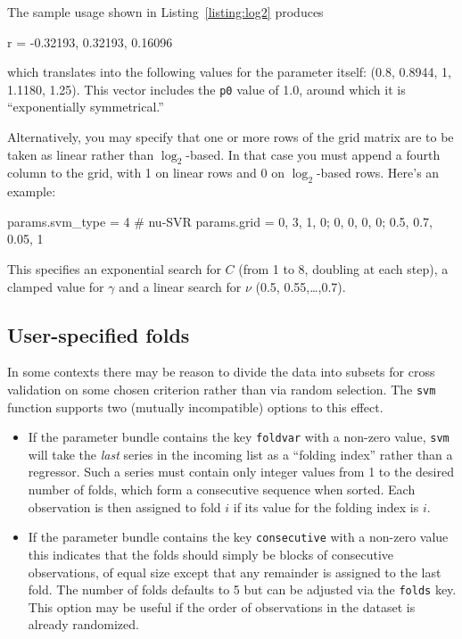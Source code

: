 \documentclass{article}
\begin{document}
The sample usage shown in Listing~\ref{listing:log2} produces
\begin{code}
r = {-0.32193, 0.32193, 0.16096}
\end{code}
which translates into the following values for the parameter itself:
(0.8, 0.8944, 1, 1.1180, 1.25). This vector includes the \texttt{p0}
value of 1.0, around which it is ``exponentially symmetrical.''

Alternatively, you may specify that one or more rows of the grid
matrix are to be taken as linear rather than $\log_2$-based. In that
case you must append a fourth column to the grid, with 1 on linear
rows and 0 on $\log_2$-based rows. Here's an example:
\begin{code}
params.svm_type = 4 # nu-SVR
params.grid = {0, 3, 1, 0; 0, 0, 0, 0; 0.5, 0.7, 0.05, 1}
\end{code}
This specifies an exponential search for $C$ (from 1 to 8, doubling at
each step), a clamped value for $\gamma$ and a linear search for
$\nu$ (0.5, 0.55,\dots,0.7).

\subsection{User-specified folds}
\label{sec:user-folds}

In some contexts there may be reason to divide the data into subsets
for cross validation on some chosen criterion rather than via random
selection. The \texttt{svm} function supports two (mutually
incompatible) options to this effect.
\begin{itemize}
\item If the parameter bundle contains the key \texttt{foldvar} with a
  non-zero value, \texttt{svm} will take the \textit{last} series in
  the incoming list as a ``folding index'' rather than a
  regressor. Such a series must contain only integer values from 1 to
  the desired number of folds, which form a consecutive sequence when
  sorted. Each observation is then assigned to fold $i$ if its value
  for the folding index is $i$.
\item If the parameter bundle contains the key \texttt{consecutive}
  with a non-zero value this indicates that the folds should simply be
  blocks of consecutive observations, of equal size except that any
  remainder is assigned to the last fold. The number of folds defaults
  to 5 but can be adjusted via the \texttt{folds} key. This option may
  be useful if the order of observations in the dataset is already
  randomized.
\end{itemize}
\end{document}
